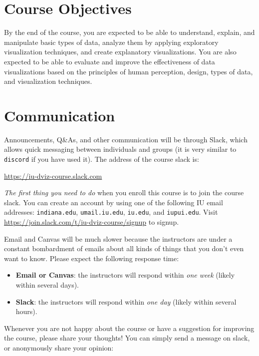 \documentclass[11pt,article,oneside]{memoir} %
\begin{document}
\section{Course Objectives}%

By the end of the course, you are expected to be able to understand, explain, and manipulate basic types of data, analyze them by applying exploratory visualization techniques, and create explanatory visualizations. 
You are also expected to be able to evaluate and improve the effectiveness of data visualizations based on the principles of human perception, design, types of data, and visualization techniques. 
 

\section{Communication} %

Announcements, Q\&As, and other communication will be through Slack, which allows quick messaging between individuals and groups (it is very similar to \texttt{discord} if you have used it). The address of the course slack is: 

\url{https://iu-dviz-course.slack.com}

\emph{The first thing you need to do} when you enroll this course is to join the course slack. You can create an account by using one of the following IU email addresses: \texttt{indiana.edu}, \texttt{umail.iu.edu}, \texttt{iu.edu}, and \texttt{iupui.edu}. Visit \url{https://join.slack.com/t/iu-dviz-course/signup} to signup.

Email and Canvas will be much slower because the instructors are under a constant bombardment of emails about all kinds of things that you don't even want to know. Please expect the following response time:

\begin{itemize}
\item \textbf{Email or Canvas}: the instructors will respond within \emph{one week} (likely within several days).
\item \textbf{Slack}: the instructors will respond within \emph{one day} (likely within several hours).

\end{itemize}

Whenever you are not happy about the course or have a suggestion for improving the course, please share your thoughts! You can simply send a message on slack, or anonymously share your opinion:
\end{document}
